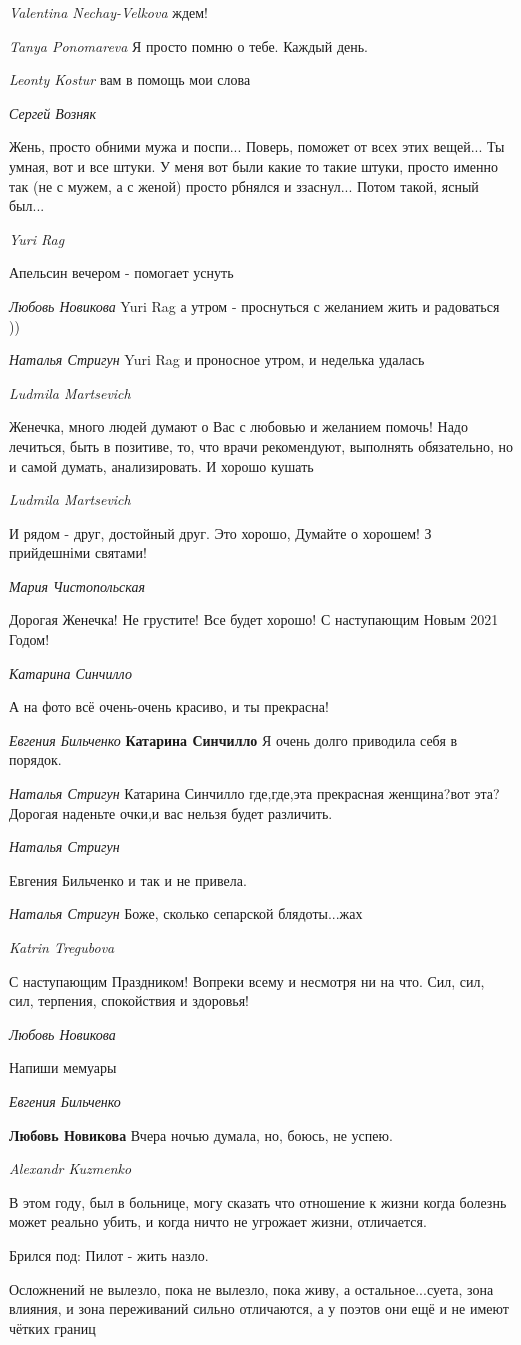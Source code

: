 \emph{Valentina Nechay-Velkova}
ждем!

\emph{Tanya Ponomareva}
Я просто помню о тебе. Каждый день.

\emph{Leonty Kostur}
вам в помощь мои слова

\emph{Сергей Возняк}

Жень, просто обними мужа и поспи... Поверь, поможет от всех этих вещей... Ты
умная, вот и все штуки. У меня вот были какие то такие штуки, просто именно так
(не с мужем, а с женой) просто рбнялся и ззаснул... Потом такой, ясный был...

\emph{Yuri Rag}

Апельсин вечером - помогает уснуть

\emph{Любовь Новикова}
Yuri Rag а утром - проснуться с желанием жить и радоваться ))

\emph{Наталья Стригун}
Yuri Rag и проносное утром, и неделька удалась

\emph{Ludmila Martsevich}

Женечка, много людей думают о Вас с любовью и желанием помочь! Надо лечиться,
быть в позитиве, то, что врачи рекомендуют, выполнять обязательно, но и самой
думать, анализировать. И хорошо кушать

\emph{Ludmila Martsevich}

И рядом - друг, достойный друг. Это хорошо, Думайте о хорошем! З прийдешніми
святами!

\emph{Мария Чистопольская}

Дорогая Женечка! Не грустите! Все будет хорошо! С наступающим Новым 2021 Годом!

\emph{Катарина Синчилло}

А на фото всё очень-очень красиво, и ты прекрасна!

\emph{Евгения Бильченко}
\textbf{Катарина Синчилло} Я очень долго приводила себя в порядок.

\emph{Наталья Стригун}
Катарина Синчилло где,где,эта прекрасная женщина?вот эта? Дорогая наденьте очки,и вас нельзя будет различить.

\emph{Наталья Стригун}

Евгения Бильченко и так и не привела.

\emph{Наталья Стригун}
Боже, сколько сепарской блядоты...жах

\emph{Katrin Tregubova}

С наступающим Праздником! Вопреки всему и несмотря ни на что. Сил, сил, сил,
терпения, спокойствия и здоровья!

\emph{Любовь Новикова}

Напиши мемуары

\emph{Евгения Бильченко}

\textbf{Любовь Новикова} Вчера ночью думала, но, боюсь, не успею.

\emph{Alexandr Kuzmenko}

В этом году, был в больнице, могу сказать что отношение к жизни когда болезнь
может реально убить, и когда ничто не угрожает жизни, отличается.

Брился под: Пилот - жить назло.

Осложнений не вылезло, пока не вылезло, пока живу, а остальное...суета, зона
влияния, и зона переживаний сильно отличаются, а у поэтов они ещё и не имеют
чётких границ
